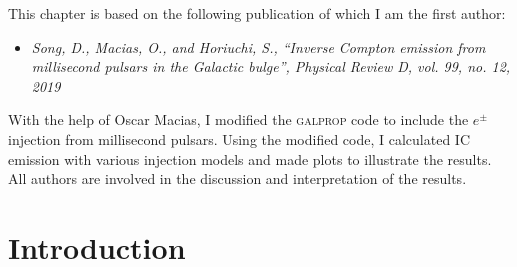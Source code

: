 \documentclass[doublespace,nopageskip]{VTthesis} %
\begin{document}
This chapter is based on the following publication of which I am the first author:
\begin{itemize}
    \item \emph{Song, D., Macias, O., and Horiuchi, S., “Inverse Compton emission from millisecond pulsars in the Galactic bulge”, Physical Review D, vol. 99, no. 12, 2019}
\end{itemize}
With the help of Oscar Macias, I modified the \textsc{galprop} code to include the $e^\pm$ injection from millisecond pulsars. Using the modified code, I calculated IC emission with various injection models and made plots to illustrate the results. All authors are involved in the discussion and interpretation of the results.

\section{Introduction}
\end{document}
